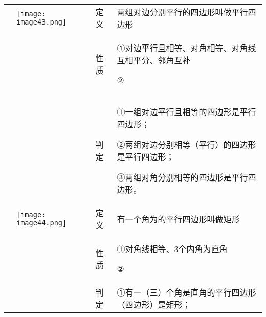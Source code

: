 \begin{longtable}[]{@{}llll@{}}
\toprule
\endhead
&
\texttt{[image: image43.png]}
& 定义 & 两组对边分别平行的四边形叫做平行四边形\tabularnewline
\begin{minipage}[t]{0.22\columnwidth}\raggedright
\strut
\end{minipage} & \begin{minipage}[t]{0.22\columnwidth}\raggedright
\strut
\end{minipage} & \begin{minipage}[t]{0.22\columnwidth}\raggedright
性质\strut
\end{minipage} & \begin{minipage}[t]{0.22\columnwidth}\raggedright
①对边平行且相等、对角相等、对角线互相平分、邻角互补

②\strut
\end{minipage}\tabularnewline
\begin{minipage}[t]{0.22\columnwidth}\raggedright
\strut
\end{minipage} & \begin{minipage}[t]{0.22\columnwidth}\raggedright
\strut
\end{minipage} & \begin{minipage}[t]{0.22\columnwidth}\raggedright
判定\strut
\end{minipage} & \begin{minipage}[t]{0.22\columnwidth}\raggedright
①一组对边平行且相等的四边形是平行四边形；

②两组对边分别相等（平行）的四边形是平行四边形；

③两组对角分别相等的四边形是平行四边形。\strut
\end{minipage}\tabularnewline
&
\texttt{[image: image44.png]}
& 定义 & 有一个角为的平行四边形叫做矩形\tabularnewline
\begin{minipage}[t]{0.22\columnwidth}\raggedright
\strut
\end{minipage} & \begin{minipage}[t]{0.22\columnwidth}\raggedright
\strut
\end{minipage} & \begin{minipage}[t]{0.22\columnwidth}\raggedright
性质\strut
\end{minipage} & \begin{minipage}[t]{0.22\columnwidth}\raggedright
①对角线相等、3个内角为直角

②\strut
\end{minipage}\tabularnewline
\begin{minipage}[t]{0.22\columnwidth}\raggedright
\strut
\end{minipage} & \begin{minipage}[t]{0.22\columnwidth}\raggedright
\strut
\end{minipage} & \begin{minipage}[t]{0.22\columnwidth}\raggedright
判定\strut
\end{minipage} & \begin{minipage}[t]{0.22\columnwidth}\raggedright
①有一（三）个角是直角的平行四边形（四边形）是矩形；


\end{minipage}
\end{longtable}
